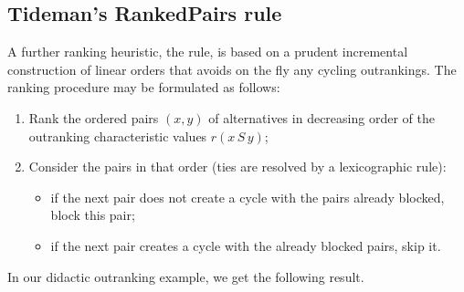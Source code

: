 \documentclass[a4paper,10pt,english]{sphinxhowto}
\begin{document}
\subsection{Tideman’s Ranked\sphinxhyphen{}Pairs rule}
\label{\detokenize{tutorial:tideman-s-ranked-pairs-rule}}
A further ranking heuristic, the  rule, is based on a prudent incremental construction of linear orders that avoids on the fly any cycling outrankings. The ranking procedure may be formulated as follows:
\begin{enumerate}
%
\item {} 
Rank the ordered pairs \((x,y)\) of alternatives in decreasing order of the outranking characteristic values \(r(x\,S\,y)\);

\item {} 
Consider the pairs in that order (ties are resolved by a lexicographic rule):
\begin{itemize}
\item {} 
if the next pair does not create a cycle with the pairs already blocked, block this pair;

\item {} 
if the next pair creates a cycle with the already blocked pairs, skip it.

\end{itemize}

\end{enumerate}

In our didactic outranking example, we get the following result.
\end{document}
